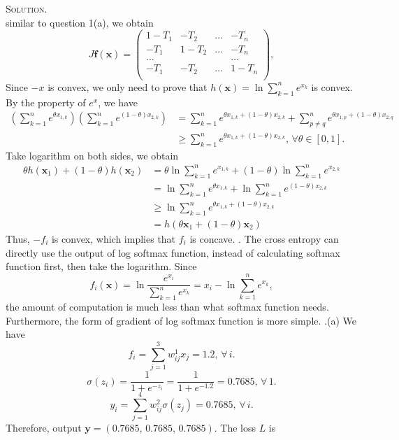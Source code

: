 \documentclass[12pt, a4paper, oneside]{ctexart}
\newenvironment{solution}{\par\noindent\textsc{Solution. }}{\\\par}
\begin{document}
\begin{solution}
\[	\]
	similar to question 1(a), we obtain
	\[
	J\mathbf{f(x)} =
	\begin{pmatrix}
	1-T_1 & -T_2 & \dots & -T_n \\
	-T_1 & 1-T_2 & \dots & -T_n \\
	\dots & & & \dots \\
	-T_1 & -T_2 & \dots & 1-T_n \\
	\end{pmatrix},
	\]
	Since $-x$ is convex, we only need to prove that $h(\mathbf{x}) = \ln\sum_{k=1}^{n}e^{x_k}$ is convex. By the property of $e^x$, we have
	\begin{align*}
		(\sum_{k=1}^{n}e^{\theta x_{1,k}})(\sum_{k=1}^{n}e^{(1-\theta) x_{2,k}}) & = \sum_{k=1}^{n}e^{\theta x_{1,k}+(1-\theta) x_{2,k}} + \sum_{p \neq q}^{n} e^{\theta x_{1,p}+(1-\theta) x_{2,q}} \\
		& \geq \sum_{k=1}^{n}e^{\theta x_{1,k}+(1-\theta) x_{2,k}},\, \forall \theta \in [0,1].
	\end{align*}
	Take logarithm on both sides, we obtain
	\begin{align*}
		\theta h(\mathbf{x}_1) + (1-\theta) h(\mathbf{x}_2) & = \theta\ln\sum_{k=1}^{n}e^{x_{1,k}} + (1-\theta)\ln\sum_{k=1}^{n}e^{x_{2,k}} \\
		& = \ln\sum_{k=1}^{n}e^{\theta x_{1,k}} + \ln\sum_{k=1}^{n}e^{(1-\theta) x_{2,k}} \\
		& \geq \ln\sum_{k=1}^{n}e^{\theta x_{1,k}+(1-\theta) x_{2,k}} \\ 
		& = h(\theta\mathbf{x}_1+(1-\theta)\mathbf{x}_2)
	\end{align*}
	Thus, $-f_i$ is convex, which implies that $f_i$ is concave.
	\newline{}. The cross entropy can directly use the output of log softmax function, instead of calculating softmax function first, then take the logarithm. Since
	\[
	f_i(\mathbf{x}) = \ln\frac{e^{x_i}}{\sum_{k=1}^{n}e^{x_k}} = x_i - \ln \sum_{k=1}^{n}e^{x_k},
	\]
	the amount of computation is much less than what softmax function needs. Furthermore, the form of gradient of log softmax function is more simple.
	\newline{}.(a) We have
	\[
	f_i = \sum_{j=1}^{3}w_{ij}^1x_j = 1.2,\, \forall\, i.
	\]
	\[
	\sigma(z_i) = \frac{1}{1+e^{-z_i}} = \frac{1}{1+e^{-1.2}} = 0.7685,\, \forall\, 1.
	\]
	\[
	y_i = \sum_{j=1}^{4}w_{ij}^2\sigma(z_j) = 0.7685,\, \forall\, i.
	\]
	Therefore, output $\mathbf{y} = (0.7685,\, 0.7685,\, 0.7685)$. The loss $L$ is

\end{solution}
\end{document}
